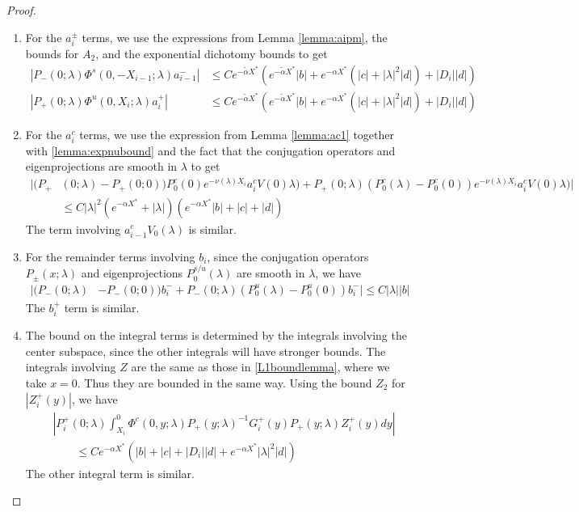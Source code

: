 \documentclass[thesis.tex]{subfiles}
\begin{document}
\begin{lemma}
\begin{proof}
\begin{enumerate}
\item For the $a_i^\pm$ terms, we use the expressions from Lemma \ref{lemma:aipm}, the bounds for $A_2$, and the exponential dichotomy bounds to get
\begin{align*}
|P_-(0; \lambda) \Phi^s(0, -X_{i-1}; \lambda) a_{i-1}^-| 
&\leq C e^{-\tilde{\alpha} X^*} \left( e^{-\tilde{\alpha} X^*} |b|  + e^{-\alpha X^*}(|c| + |\lambda|^2 |d|) + |D_i||d| \right)\\
|P_+(0; \lambda) \Phi^u(0, X_i; \lambda) a_i^+| 
&\leq C e^{-\tilde{\alpha} X^*} \left( e^{-\tilde{\alpha} X^*} |b|  + e^{-\alpha X^*}(|c| + |\lambda|^2 |d|) + |D_i||d| \right)
\end{align*}

\item For the $a_i^c$ terms, we use the expression from Lemma \ref{lemma:ac1} together with \cref{lemma:expnubound} and the fact that the conjugation operators and eigenprojections are smooth in $\lambda$ to get
\begin{align*}
|(P_+&(0; \lambda) - P_+(0; 0))P_0^c(0) e^{-\nu(\lambda)X_i} a_i^c V(0)
\lambda) + P_+(0; \lambda) (P_0^c(\lambda) - P_0^c(0)) e^{-\nu(\lambda)X_i} a_i^c V(0)
\lambda)| \\
&\leq C |\lambda|^2 ( e^{-\alpha X^*} + |\lambda|) \left( e^{-\alpha X^*}  |b| + |c| + |d| \right)
\end{align*}
The term involving $a_{i-1}^c V_0(\lambda)$ is similar. 

\item For the remainder terms involving $b_i$, since the conjugation operators $P_\pm(x; \lambda)$ and eigenprojections $P_0^{s/u}(\lambda)$ are smooth in $\lambda$, we have
\begin{align*}
|(P_-(0; \lambda) &- P_-(0; 0))b_i^- + P_-(0; \lambda)(P_0^u(\lambda) - P_0^u(0))b_i^-| \leq C |\lambda| |b|
\end{align*}
The $b_i^+$ term is similar.

\item The bound on the integral terms is determined by the integrals involving the center subspace, since the other integrals will have stronger bounds. The integrals involving $Z$ are the same as those in \cref{L1boundlemma}, where we take $x = 0$. Thus they are bounded in the same way. Using the bound $Z_2$ for $| Z_i^+(y)|$, we have 
\begin{align*}
&\left| P_i^+(0; \lambda) \int_{X_i}^0 \Phi^c(0, y; \lambda) P_+(y; \lambda)^{-1} G_i^+(y) P_+(y; \lambda) Z_i^+(y) dy \right| \\
&\qquad \leq C e^{-\alpha X^*} \left(|b| + |c| + |D_i||d| + e^{-\alpha X^*}|\lambda|^2|d|\right)
\end{align*}
The other integral term is similar.


\end{enumerate}
\end{proof}
\end{lemma}
\end{document}
